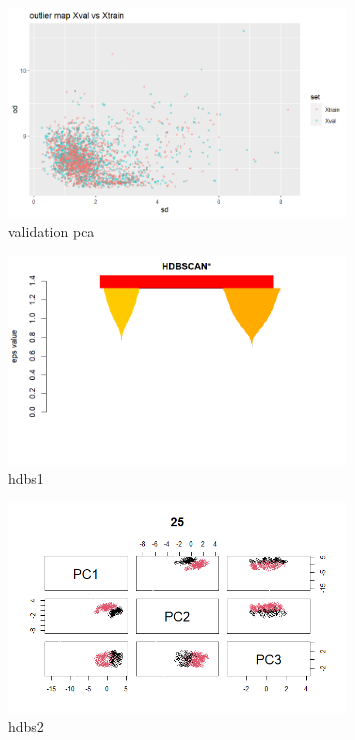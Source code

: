 \documentclass{article}
\begin{document}
\begin{figure}[h!]
        \centering
        \includegraphics[width=0.8\textwidth]{../plots/val_PCA.png}
        \caption{validation pca}
        \label{fig:valpca}
\end{figure}

\begin{figure}[h!]
        \centering
        \includegraphics[width=0.8\textwidth]{../plots/hdbs1.png}
        \caption{hdbs1}
        \label{fig:hdbs1}
\end{figure}

\begin{figure}[h!]
        \centering
        \includegraphics[width=0.8\textwidth]{../plots/hdbs2.png}
        \caption{hdbs2}
        \label{fig:hdbs2}
\end{figure}
\end{document}
